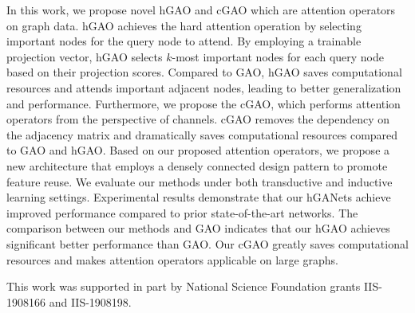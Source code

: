 \documentclass[sigconf]{acmart}
\begin{document}
In this work, we propose novel hGAO and cGAO which are attention
operators on graph data. hGAO achieves the hard attention operation
by selecting important nodes for the query node to attend. By
employing a trainable projection vector, hGAO selects $k$-most
important nodes for each query node based on their projection
scores. Compared to GAO, hGAO saves computational resources and
attends important adjacent nodes, leading to better generalization
and performance. Furthermore, we propose the cGAO, which performs
attention operators from the perspective of channels. cGAO removes
the dependency on the adjacency matrix and dramatically saves
computational resources compared to GAO and hGAO. Based on our
proposed attention operators, we propose a new architecture that
employs a densely connected design pattern to promote feature reuse.
We evaluate our methods under both transductive and inductive
learning settings. Experimental results demonstrate that our hGANets
achieve improved performance compared to prior state-of-the-art
networks. The comparison between our methods and GAO indicates that
our hGAO achieves significant better performance than GAO. Our cGAO
greatly saves computational resources and makes attention operators
applicable on large graphs.

\begin{acks}
This work was supported in part by National Science Foundation grants
IIS-1908166 and IIS-1908198.
\end{acks}



\end{document}
